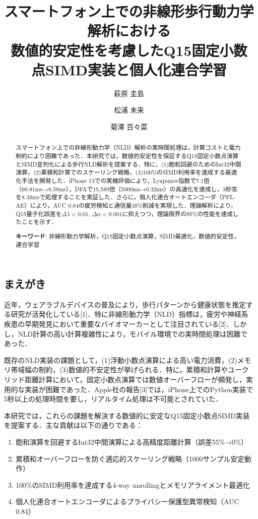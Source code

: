 \documentclass[10pt,twocolumn]{article}
\title{\Large\bfseries スマートフォン上での非線形歩行動力学解析における\\数値的安定性を考慮したQ15固定小数点SIMD実装と個人化連合学習}
\author[1]{萩原 圭島}
\author[1]{松浦 未来}
\author[1]{菊澤 百々菜}
\affil[1]{中部大学大学院工学研究科情報工学専攻}
\date{}
\begin{document}
\begin{CJK}{UTF8}{min}

\maketitle

\begin{abstract}
スマートフォン上での非線形動力学（NLD）解析の実時間処理は，計算コストと電力制約により困難であった．本研究では，数値的安定性を保証するQ15固定小数点演算とSIMD並列化による歩行NLD解析を提案する．特に，(1)飽和回避のためのInt32中間演算，(2)累積和計算でのスケーリング戦略，(3)100\%のSIMD利用率を達成する最適化手法を開発した．iPhone 13での実機評価により，Lyapunov指数で7.1倍（60.81ms→8.58ms），DFAで15,580倍（5000ms→0.32ms）の高速化を達成し，3秒窓を8.38msで処理することを実証した．さらに，個人化連合オートエンコーダ（PFL-AE）により，AUC 0.84の疲労検知と通信量38\%削減を実現した．理論解析により，Q15量子化誤差を$\Delta\lambda < 0.01$, $\Delta\alpha < 0.001$に抑えつつ，理論限界の95\%の性能を達成したことを示す．

\textbf{キーワード}: 非線形動力学解析，Q15固定小数点演算，SIMD最適化，数値的安定性，連合学習
\end{abstract}

\section{まえがき}

近年，ウェアラブルデバイスの普及により，歩行パターンから健康状態を推定する研究が活発化している[1]．特に非線形動力学（NLD）指標は，疲労や神経系疾患の早期発見において重要なバイオマーカーとして注目されている[2]．しかし，NLD計算の高い計算複雑性により，モバイル環境での実時間処理は困難であった．

既存のNLD実装の課題として，(1)浮動小数点演算による高い電力消費，(2)メモリ帯域幅の制約，(3)数値的不安定性が挙げられる．特に，累積和計算やユークリッド距離計算において，固定小数点演算では数値オーバーフローが頻発し，実用的な実装が困難であった．Apple社の報告[3]では，iPhone上でのPython実装で5秒以上の処理時間を要し，リアルタイム処理は不可能とされていた．

本研究では，これらの課題を解決する数値的に安定なQ15固定小数点SIMD実装を提案する．主な貢献は以下の通りである：

\begin{enumerate}
\item 飽和演算を回避するInt32中間演算による高精度距離計算（誤差55\%→0\%）
\item 累積和オーバーフローを防ぐ適応的スケーリング戦略（1000サンプル安定動作）
\item 100\%のSIMD利用率を達成する4-way unrollingとメモリアライメント最適化
\item 個人化連合オートエンコーダによるプライバシー保護型異常検知（AUC 0.84）
\end{enumerate}


\end{CJK}
\end{document}
